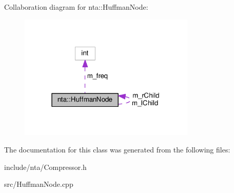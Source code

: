 Collaboration diagram for nta\+:\+:Huffman\+Node\+:
\nopagebreak
\begin{figure}[H]
\begin{center}
\leavevmode
\includegraphics[width=238pt]{d5/d0a/classnta_1_1HuffmanNode__coll__graph}
\end{center}
\end{figure}


The documentation for this class was generated from the following files\+:\begin{DoxyCompactItemize}
\item 
include/nta/Compressor.\+h\item 
src/Huffman\+Node.\+cpp\end{DoxyCompactItemize}

